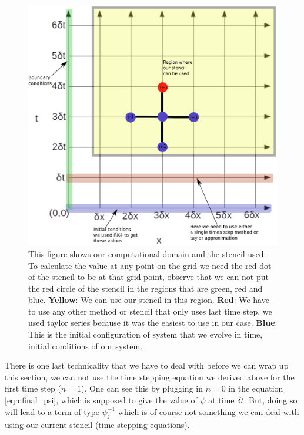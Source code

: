\begin{figure}[hbt!]
    \centering
    \includegraphics[width=\textwidth]{images/labelled_grid.eps}
    \caption{This figure shows our computational domain and the stencil used. To calculate the value at any point on the grid we need the red dot of the stencil to be at that grid point, observe that we can not put the red circle of the stencil in the regions that are green, red and blue. \textbf{Yellow}: We can use our stencil in this region. \textbf{Red}: We have to use any other method or stencil that only uses last time step, we used taylor series because it was the easiest to use in our case. \textbf{Blue}: This is the initial configuration of system that we evolve in time, initial conditions of our system.}
    \label{fig:grid_with_stencil_and_regions}
\end{figure}



There is one last technicality that we have to deal with before we can wrap up this section, we can not use the time stepping equation we derived above for the first time step ($n=1$). One can see this by plugging in $n=0$ in the equation \ref{eqn:final_psi}, which is supposed to give the value of $\psi$ at time $\delta t$. But, doing so will lead to a term of type $\psi^{-1}_j$ which is of course not something we can deal with using our current stencil (time stepping equations).


